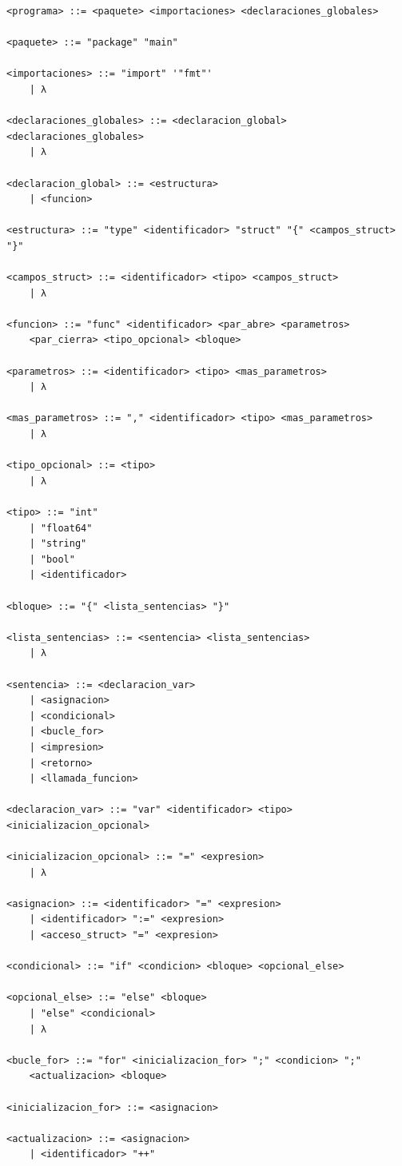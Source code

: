 \documentclass[11pt, a4paper]{article}
\begin{document}
\begin{lstlisting}[style=gramatica]
<programa> ::= <paquete> <importaciones> <declaraciones_globales>

<paquete> ::= "package" "main"

<importaciones> ::= "import" '"fmt"'
    | λ

<declaraciones_globales> ::= <declaracion_global> <declaraciones_globales>
    | λ

<declaracion_global> ::= <estructura>
    | <funcion>

<estructura> ::= "type" <identificador> "struct" "{" <campos_struct> "}"

<campos_struct> ::= <identificador> <tipo> <campos_struct>
    | λ

<funcion> ::= "func" <identificador> <par_abre> <parametros>
    <par_cierra> <tipo_opcional> <bloque>

<parametros> ::= <identificador> <tipo> <mas_parametros>
    | λ

<mas_parametros> ::= "," <identificador> <tipo> <mas_parametros>
    | λ

<tipo_opcional> ::= <tipo>
    | λ

<tipo> ::= "int"
    | "float64"
    | "string"
    | "bool"
    | <identificador>

<bloque> ::= "{" <lista_sentencias> "}"

<lista_sentencias> ::= <sentencia> <lista_sentencias>
    | λ

<sentencia> ::= <declaracion_var>
    | <asignacion>
    | <condicional>
    | <bucle_for>
    | <impresion>
    | <retorno>
    | <llamada_funcion>

<declaracion_var> ::= "var" <identificador> <tipo> <inicializacion_opcional>

<inicializacion_opcional> ::= "=" <expresion>
    | λ

<asignacion> ::= <identificador> "=" <expresion>
    | <identificador> ":=" <expresion>
    | <acceso_struct> "=" <expresion>

<condicional> ::= "if" <condicion> <bloque> <opcional_else>

<opcional_else> ::= "else" <bloque>
    | "else" <condicional>
    | λ

<bucle_for> ::= "for" <inicializacion_for> ";" <condicion> ";"
    <actualizacion> <bloque>

<inicializacion_for> ::= <asignacion>

<actualizacion> ::= <asignacion>
    | <identificador> "++"


\end{lstlisting}
\end{document}
